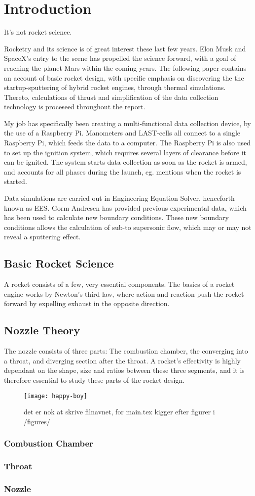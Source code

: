 \chapter{Introduction}

It's not rocket science.

Rocketry and its science is of great interest these last few years. Elon Musk and SpaceX's entry to the scene has propelled the science forward, with a goal of reaching the planet Mars within the coming years. The following paper contains an account of basic rocket design, with specific emphasis on discovering the the startup-sputtering of hybrid rocket engines, through thermal simulations. Thereto, calculations of thrust and simplification of the data collection technology is proceseed throughout the report.

My job has specifically been creating a multi-functional data collection device, by the use of a Raspberry Pi. Manometers and LAST-cells all connect to a single Raspberry Pi, which feeds the data to a computer. The Raspberry Pi is also used to set up the ignition system, which requires several layers of clearance before it can be ignited. The system starts data collection as soon as the rocket is armed, and accounts for all phases during the launch, eg. mentions when the rocket is started.

Data simulations are carried out in Engineering Equation Solver, henceforth known as EES. Gorm Andresen has provided previous experimental data, which has been used to calculate new boundary conditions. These new boundary conditions allows the calculation of sub-to supersonic flow, which may or may not reveal a sputtering effect.

\section{Basic Rocket Science}

A rocket consists of a few, very essential components. The basics of a rocket engine works by Newton's third law, where action and reaction push the rocket forward by expelling exhaust in the opposite direction.

\section{Nozzle Theory}

The nozzle consists of three parts: The combustion chamber, the converging into a throat, and diverging section after the throat. A rocket's effectivity is highly dependant on the shape, size and ratios between these three segments, and it is therefore essential to study these parts of the rocket design.

\begin{figure}
\texttt{[image: happy-boy]}
\caption{det er nok at skrive filnavnet, for main.tex kigger efter figurer i /figures/}
\label{fig:yyy}
\end{figure}


\subsection{Combustion Chamber}
\subsection{Throat}
\subsection{Nozzle}
